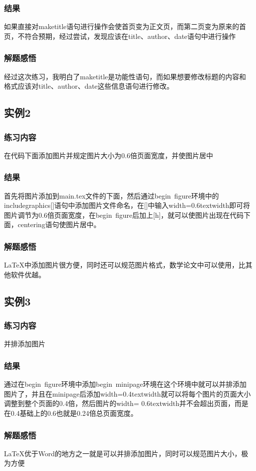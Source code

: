 \documentclass{ctexart}
\begin{document}
\subsubsection{结果}
如果直接对maketitle语句进行操作会使首页变为正文页，而第二页变为原来的首页，不符合预期，经过尝试，发现应该在title、author、date语句中进行操作
\subsubsection{解题感悟}
经过这次练习，我明白了maketitle是功能性语句，而如果想要修改标题的内容和格式应该对title、author、date这些信息语句进行修改。
\subsection{实例2}
\subsubsection{练习内容}
在代码下面添加图片并规定图片大小为0.6倍页面宽度，并使图片居中
\subsubsection{结果}
首先将图片添加到main.tex文件的下面，然后通过begin\ {figure}环境中的includegraphics[]{}语句中添加图片文件命名，在[]中输入width=0.6textwidth即可将图片调节为0.6倍页面宽度，在begin\ {figure}后加上[h]，就可以使图片出现在代码下面，centering语句使图片居中。
\subsubsection{解题感悟}
LaTeX中添加图片很方便，同时还可以规范图片格式，数学论文中可以使用，比其他软件优越。
\subsection{实例3}
\subsubsection{练习内容}
并排添加图片
\subsubsection{结果}
通过在begin\ {figure}环境中添加begin\ {minipage}环境在这个环境中就可以并排添加图片了，并且在minipage后添加width=0.4textwidth就可以将每个图片的页面大小调整到整个页面的0.4倍，然后图片的width=
0.6textwidth并不会超出页面，而是在0.4基础上的0.6也就是0.24倍总页面宽度。
\subsubsection{解题感悟}
LaTeX优于Word的地方之一就是可以并排添加图片，同时可以规范图片大小，极为方便
\end{document}
